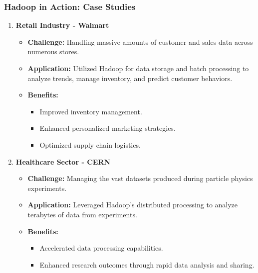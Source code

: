 \documentclass{beamer}
\begin{document}
\begin{frame}[fragile]
    \frametitle{Hadoop in Action: Case Studies}
    \begin{enumerate}
        \item \textbf{Retail Industry - Walmart}
            \begin{itemize}
                \item \textbf{Challenge:} Handling massive amounts of customer and sales data across numerous stores.
                \item \textbf{Application:} Utilized Hadoop for data storage and batch processing to analyze trends, manage inventory, and predict customer behaviors.
                \item \textbf{Benefits:}
                    \begin{itemize}
                        \item Improved inventory management.
                        \item Enhanced personalized marketing strategies.
                        \item Optimized supply chain logistics.
                    \end{itemize}
            \end{itemize}
        
        \item \textbf{Healthcare Sector - CERN}
            \begin{itemize}
                \item \textbf{Challenge:} Managing the vast datasets produced during particle physics experiments.
                \item \textbf{Application:} Leveraged Hadoop's distributed processing to analyze terabytes of data from experiments.
                \item \textbf{Benefits:}
                    \begin{itemize}
                        \item Accelerated data processing capabilities.
                        \item Enhanced research outcomes through rapid data analysis and sharing.
                    \end{itemize}
            \end{itemize}
    \end{enumerate}
\end{frame}
\end{document}

